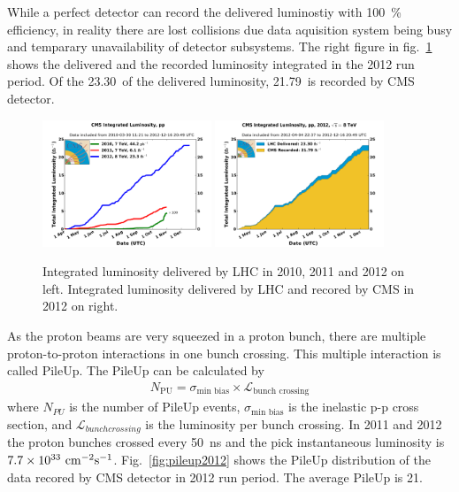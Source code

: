 While a perfect detector can record the delivered luminostiy 
with 100~\% efficiency, in reality there are lost collisions 
due data aquisition system being busy and temparary unavailability 
of detector subsystems.  
The right figure in fig.~\ref{fig:intlumi} shows the delivered and the recorded luminosity 
integrated in the 2012 run period. Of the 23.30~\ifb of the delivered luminosity,  
21.79~\ifb is recorded by CMS detector.  

%
\begin{figure}[ht!] 
\centering 
\includegraphics[width=0.45\textwidth]{figures/int_lumi_cumulative_pp_2.pdf}
\includegraphics[width=0.45\textwidth]{figures/int_lumi_per_day_cumulative_pp_2012.pdf}
\caption{Integrated luminosity delivered by LHC in 2010, 2011 and 2012 on left. 
Integrated luminosity delivered by LHC and recored by CMS in 2012 on right.} 
\label{fig:intlumi} 
\end{figure} 

As the proton beams are very squeezed in a proton bunch, there are multiple 
proton-to-proton interactions in one bunch crossing. This multiple interaction 
is called PileUp. The PileUp can be calculated by 
\begin{eqnarray} 
N_\textrm{{PU}} 
= 
\sigma_{\textrm{min bias}} \times \mathcal{L}_{\textrm{bunch crossing}} 
\end{eqnarray} 
where $N_{PU}$ is the number of PileUp events, 
$\sigma_{\textrm{min bias}}$ is the inelastic p-p cross section, 
and $\mathcal{L}_{bunch crossing}$ is the luminosity per bunch crossing.
In 2011 and 2012 the proton bunches crossed every 50~ns 
and the pick instantaneous luminosity is $7.7\times 10^{33} ~\mathrm{cm}^{-2}\textrm{s}^{-1}$. 
Fig.~\ref{fig:pileup2012} shows the PileUp distribution 
of the data recored by CMS detector in 2012 run period. 
The average PileUp is 21. 


